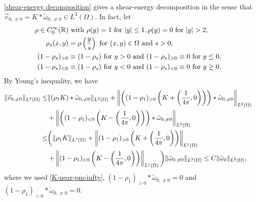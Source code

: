 \documentclass[1 [leqno, 11pt]{amsart}
\numberwithin{equation}{section}
\begin{document}
\begin{CJK*}{GBK}{song}
\begin{appendix}
\eqref{shear-energy decomposition}  gives a shear-energy decomposition in the sense that $\vec{v}_{0,\neq0}=K*\tilde\omega_{0,\neq0}\in L^2(\Omega)$. In fact,
let
 \begin{align}\nonumber
 \rho\in C_0^\infty(\mathbb{R})& \text{ with }\rho(y)=1 \text{ for } |y|\leq 1, \rho(y)=0 \text{ for } |y|>2,\\\nonumber
 \rho_s(x,y)&=\rho\left({y\over s}\right) \text{ for }(x,y)\in \Omega \text{ and }s>0, \\\nonumber
(1-\rho_{s})_{>0}&\equiv(1-\rho_{s}) \text{ for } y>0 \text{ and } (1-\rho_{s})_{>0}\equiv0 \text{ for } y\leq0,\\\label{def-cut off functions}
 (1-\rho_{s})_{<0}&\equiv(1-\rho_{s}) \text{ for } y<0 \text{ and } (1-\rho_{s})_{<0}\equiv0 \text{ for } y\geq0.
 \end{align}
  By Young's inequality, we have
\begin{align*}
\|\vec{v}_{0,\neq0}\|_{L^2(\Omega)}\leq& \|(\rho_1K)\ast\tilde\omega_{0,\neq0}\|_{L^2(\Omega)}+\left\|\left((1-\rho_1)_{>0}\left(K+\left({1\over 4\pi},0\right)\right)\right)\ast\tilde\omega_{0,\neq0}\right\|_{L^2(\Omega)}\\
&+\left\|\left((1-\rho_1)_{<0}\left(K-\left({1\over 4\pi},0\right)\right)\right)\ast\tilde\omega_{0,\neq0}\right\|_{L^2(\Omega)}\\
\leq&\bigg( \|\rho_1K\|_{L^1(\Omega)}+\left\|(1-\rho_1)_{>0}\left(K+\left({1\over 4\pi},0\right)\right)\right\|_{L^1(\Omega)}\\
&+\left\|(1-\rho_1)_{<0}\left(K-\left({1\over 4\pi},0\right)\right)\right\|_{L^1(\Omega)}\bigg)\|\tilde\omega_{0,\neq0}\|_{L^2(\Omega)}\leq C\|\tilde\omega_{0}\|_{L^2(\Omega)},
\end{align*}
 where we used \eqref{K-near-pm-infty}, $(1-\rho_1)_{>0}\ast\tilde\omega_{0,\neq0}=0$ and $(1-\rho_1)_{<0}\ast\tilde\omega_{0,\neq0}=0$.


\end{appendix}
\end{CJK*}
\end{document}
